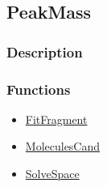 \subsection{PeakMass}\label{PeakMass}
\subsubsection{Description}


\subsubsection{Functions}
\begin{itemize}
\item \hyperref[FitFragment]{FitFragment}
\item \hyperref[MoleculesCand]{MoleculesCand}
\item \hyperref[SolveSpace]{SolveSpace}
\end{itemize}

